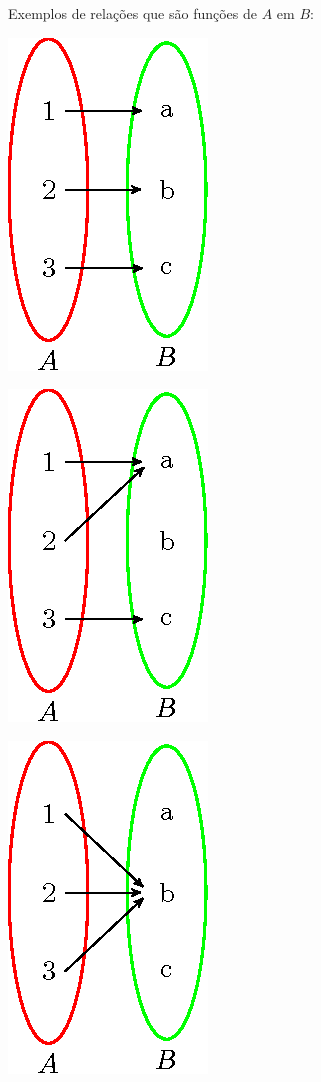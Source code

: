  Exemplos de relações que são funções de $A$ em $B$:
 \begin{multicols}{3}
 \includegraphics{cap_funcao/figs/tikz/figura_cap_funcao_1} 

 \includegraphics{cap_funcao/figs/tikz/figura_cap_funcao_2}

\includegraphics{cap_funcao/figs/tikz/figura_cap_funcao_3}

\end{multicols}

